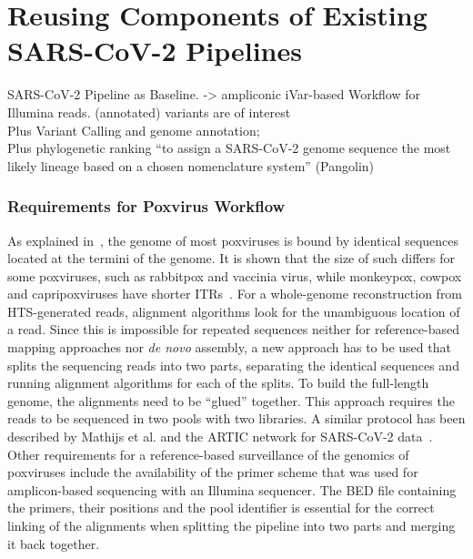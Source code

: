 \section{Reusing Components of Existing SARS-CoV-2 Pipelines}
\todoit
\ac{SARS-CoV-2} Pipeline as Baseline. -> ampliconic iVar-based Workflow for Illumina reads.
(annotated) variants are of interest \\

Plus Variant Calling and genome annotation; \\
Plus phylogenetic ranking ``to assign a \ac{SARS-CoV-2} genome sequence the most likely lineage based on a chosen nomenclature system'' (Pangolin)

\subsubsection{Requirements for Poxvirus Workflow}
As explained in~, the genome of most poxviruses is bound by identical sequences located at the termini of the genome. It is shown that the size of such differs for some poxviruses, such as rabbitpox and vaccinia virus, while monkeypox, cowpox and capripoxviruses have shorter \acp{ITR}~\cite{wittek1978inverted}. For a whole-genome reconstruction from \ac{HTS}-generated reads, alignment algorithms look for the unambiguous location of a read. Since this is impossible for repeated sequences neither for reference-based mapping approaches nor \textit{de novo} assembly, a new approach has to be used that splits the sequencing reads into two parts, separating the identical sequences and running alignment algorithms for each of the splits. To build the full-length genome, the alignments need to be ``glued'' together. This approach requires the reads to be sequenced in two pools with two libraries. A similar protocol has been described by Mathijs et al. and the ARTIC network for SARS-CoV-2 data~\cite{mathijs2022robust, tyson2020improvements}. \\
Other requirements for a reference-based surveillance of the genomics of poxviruses include the availability of the primer scheme that was used for amplicon-based sequencing with an Illumina sequencer. The \ac{BED} file containing the primers, their positions and the pool identifier is essential for the correct linking of the alignments when splitting the pipeline into two parts and merging it back together.

